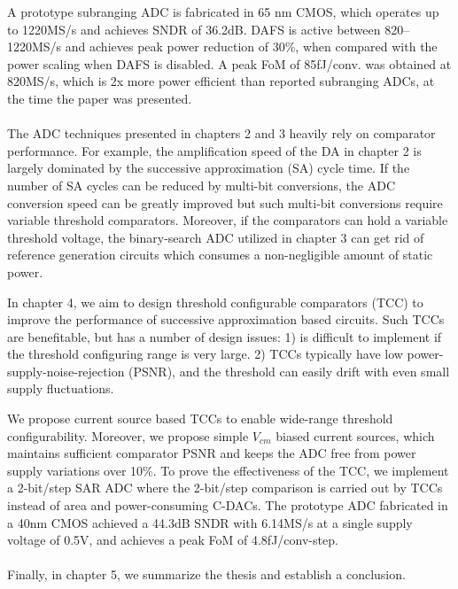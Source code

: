 A prototype subranging ADC is fabricated in 65 nm CMOS, which operates up to 1220MS/s and achieves SNDR of 36.2dB. 
DAFS is active between 820–1220MS/s and achieves peak power reduction of 30\%, when compared with the power scaling when DAFS is disabled. 
A peak FoM of 85fJ/conv. was obtained at 820MS/s, which is 2x more power efficient than reported subranging ADCs, at the time the paper was presented.
\\
\\
The ADC techniques presented in chapters 2 and 3 heavily rely on comparator performance.
For example, the amplification speed of the DA in chapter 2 is largely dominated by the successive approximation (SA) cycle time. 
If the number of SA cycles can be reduced by multi-bit conversions, the ADC conversion speed can be greatly improved but such multi-bit conversions require variable threshold comparators.
Moreover, if the comparators can hold a variable threshold voltage, the binary-search ADC utilized in chapter 3 can get rid of reference generation circuits which consumes a non-negligible amount of static power.

In chapter 4, we aim to design threshold configurable comparators (TCC) to improve the performance of successive approximation based circuits.
Such TCCs are benefitable, but has a number of design issues: 1) is difficult to implement if the threshold configuring range is very large. 2) TCCs typically have low power-supply-noise-rejection (PSNR), and the threshold can easily drift with even small supply fluctuations.

We propose current source based TCCs to enable wide-range threshold configurability. 
Moreover, we propose simple $V_{cm}$ biased current sources, which maintains sufficient comparator PSNR and keeps the ADC free from power supply variations over 10\%. 
To prove the effectiveness of the TCC, we implement a 2-bit/step SAR ADC where the 2-bit/step comparison is carried out by TCCs instead of area and power-consuming C-DACs.
The prototype ADC fabricated in a 40nm CMOS achieved a 44.3dB SNDR with 6.14MS/s at a single supply voltage of 0.5V, and achieves a peak FoM of 4.8fJ/conv-step.
\\
\\
Finally, in chapter 5, we summarize the thesis and establish a conclusion.
